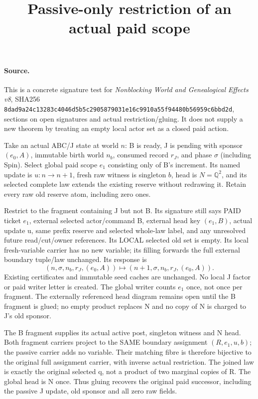 \documentclass{article}\usepackage{amsmath,amssymb}
\title{Passive-only restriction of an actual paid scope}
\begin{document}
\maketitle
\paragraph{Source.} This is a concrete signature test for \emph{Nonblocking World and Genealogical Effects v8}, SHA256 \texttt{8dad9a24c13283c4046d5b5c2905879031e16c9910a55f94480b56959c6bbd2d}, sections on open signatures and actual restriction/gluing. It does not supply a new theorem by treating an empty local actor set as a closed paid action.

Take an actual ABC/J state at world $n$: B is ready, J is pending with sponsor $(e_0,A)$, immutable birth world $n_b$, consumed record $r_J$, and phase $\sigma$ (including Spin). Select global paid scope $e_1$ consisting only of B's increment. Its named update is $u:n\to n+1$, fresh raw witness is singleton $b$, head is $N=\mathbb Q^2$, and its selected complete law extends the existing reserve without redrawing it. Retain every raw old reserve atom, including zero ones.

Restrict to the fragment containing J but not B. Its signature still says PAID ticket $e_1$, external selected actor/command B, external head key $(e_1,B)$, actual update u, same prefix reserve and selected whole-law label, and any unresolved future read/cut/owner references. Its LOCAL selected old set is empty. Its local fresh-variable carrier has no new variable; its filling forwards the full external boundary tuple/law unchanged. Its response is
\[
 (n,\sigma,n_b,r_J,(e_0,A))\longmapsto
 (n+1,\sigma,n_b,r_J,(e_0,A)).
\]
Existing certificates and immutable seed caches are unchanged. No local J factor or paid writer letter is created. The global writer counts $e_1$ once, not once per fragment. The externally referenced head diagram remains open until the B fragment is glued; no empty product replaces N and no copy of N is charged to J's old sponsor.

The B fragment supplies its actual active post, singleton witness and N head. Both fragment carriers project to the SAME boundary assignment $(R,e_1,u,b)$; the passive carrier adds no variable. Their matching fibre is therefore bijective to the original full assignment carrier, with inverse actual restriction. The joined law is exactly the original selected q, not a product of two marginal copies of R. The global head is N once. Thus gluing recovers the original paid successor, including the passive J update, old sponsor and all zero raw fields.
\end{document}
